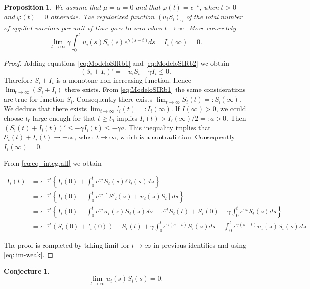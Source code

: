 \documentclass[a4paper,10pt]{article}
\newtheorem{conj}[thm]{Conjecture}
\newtheorem{prop}[thm]{Proposition}
\theoremstyle{remark}
\begin{document}
\begin{prop} We assume that $\mu=\alpha=0$ and  that $\varphi(t)=e^{-t}$, when $t>0$ and $\varphi(t)=0$ otherwise. The regularized function $(u_iS_i)_\gamma$ of the total number of appiled vaccines per unit of time goes to zero when $t\to\infty$. More concretely
\[
 \lim\limits_{t\to\infty}\gamma\int_0^t  u_i(s)S_i(s)
  e^{\gamma (s-t)}ds=I_i(\infty)=0.
\]

 
\end{prop}

\begin{proof} Adding equations \eqref{eq:ModeloSIRb1} and \eqref{eq:ModeloSIRb2} we obtain 
\[
 (S_i+I_i)'=- u_iS_i-\gamma I_i\leq 0.
\]
Therefore  $S_i+I_i$ is a monotone non increasing function. Hence $\lim_{t\to\infty} (S_i+I_i)$ there exists. From \eqref{eq:ModeloSIRb1} the same considerations are true for function $S_i$. Consequently there exists $\lim_{t\to\infty} S_i(t)=:S_i(\infty)$. We deduce that there exists  $\lim_{t\to\infty} I_i(t)=:I_i(\infty)$. If $I(\infty)>0$, we could choose $t_0$ large enough for that $t\geq t_0$ implies $I_i(t)>I_i(\infty)/2=:a>0$. Then $(S_i(t)+I_i(t))'\leq -\gamma I_i(t)\leq -\gamma a$. This inequality implies that $S_i(t) +I_i(t)\to -\infty$, when $t\to\infty$, which is a contradiction. Consequently $I_i(\infty)=0$. 

 
From  \eqref{eq:eq_integralI} we obtain 


\[
\begin{split}
 I_i(t)&=e^{-\gamma t}
 \left\{
    I_i(0)+\int_0^t e^{\gamma s} S_{i}(s) \Theta_i(s)ds
\right\}\\
&= e^{-\gamma t}
 \left\{
    I_i(0)-\int_0^t e^{\gamma s} \left[S'_i(s)+ u_i(s)S_i\right]ds 
  \right\}\\
  &= e^{-\gamma t}
 \left\{
    I_i(0)-\int_0^t e^{\gamma s}   u_i(s)S_i(s)ds
    -e^{\gamma t}S_i(t)+S_i(0)-\gamma\int_0^t e^{\gamma s} S_{i}(s) ds 
  \right\}\\
   &= e^{-\gamma t}\left(S_i(0)+ I_i(0)  \right)-S_i(t)
   +\gamma \int_0^t e^{\gamma (s-t)}S_{i}(s)ds-\int_0^t e^{\gamma (s-t)}   u_i(s)S_i(s)ds
 \end{split}
\]

The proof is completed by taking limit for $t\to\infty$ in previous identities and using \eqref{eq:lim-weak}. 
\end{proof}


\begin{conj} 
 \[
 \lim\limits_{t\to\infty}  u_i(s)S_i(s)
=0.
\]

\end{conj}
\end{document}
